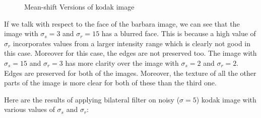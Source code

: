 \documentclass[12pt]{article}
\begin{document}
\begin{figure}[h]
    \caption{Mean-shift Versions of kodak image }
    \label{fig:overall}
\end{figure}

If we talk with respect to the face of the barbara image, we can see that the image with $\sigma_s=3$ and $\sigma_r=15$ has a blurred face. This is because a high value of $\sigma_r$ incorporates values from a larger intensity range which is clearly not good in this case. Moreover for this case, the edges are not preserved too. The image with $\sigma_s=15$ and $\sigma_r=3$ has more clarity over the image with $\sigma_s=2$ and $\sigma_r=2$. Edges are preserved for both of the images. Moreover, the texture of all the other parts of the image is more clear for both of these than the third one.


Here are the results of applying bilateral filter on noisy ($\sigma = 5$) kodak image with various values of $\sigma_s$ and $\sigma_r$:
\end{document}
